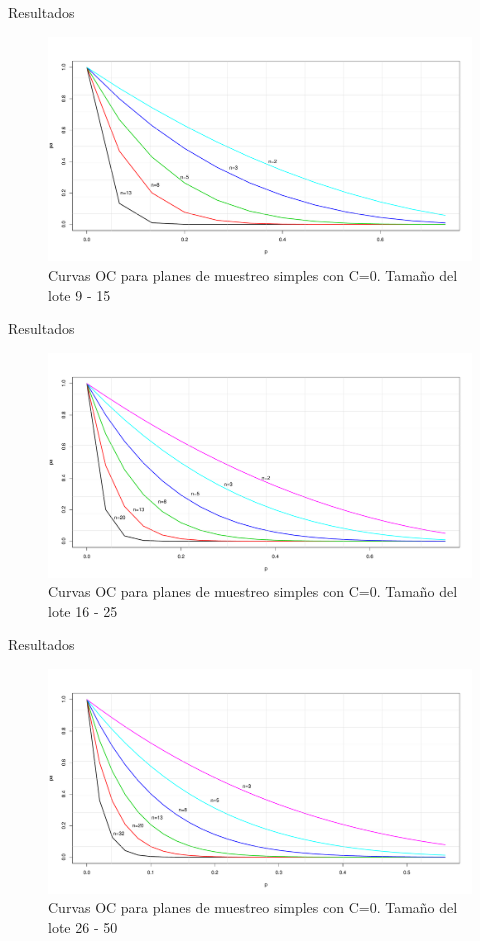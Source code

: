 \documentclass[10pt]{beamer}
\begin{document}
\begin{frame}{Resultados}
\begin{figure}[h!]
  \centering
  \includegraphics[scale=0.33]{FigurasUV/CO2.pdf}
  \caption{Curvas OC para planes de muestreo simples con C=0. Tamaño del lote 9 - 15}
\end{figure}
\end{frame}

\begin{frame}{Resultados}
\begin{figure}[h!]
  \centering
  \includegraphics[scale=0.33]{FigurasUV/CO3.pdf}
  \caption{Curvas OC para planes de muestreo simples con C=0. Tamaño del lote 16 - 25}
\end{figure}
\end{frame}

\begin{frame}{Resultados}
\begin{figure}[h!]
  \centering
  \includegraphics[scale=0.33]{FigurasUV/CO4.pdf}
  \caption{Curvas OC para planes de muestreo simples con C=0. Tamaño del lote 26 - 50}
\end{figure}
\end{frame}
\end{document}
